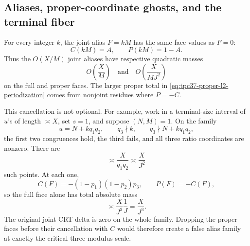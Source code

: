 \subsection{Aliases, proper-coordinate ghosts, and the terminal fiber}

For every integer \(k\), the joint alias \(F=kM\) has the same face values
as \(F=0\):
\begin{equation}
 C(kM)=A,
 \qquad
 P(kM)=1-A.
 \label{eq:tpc37-joint-alias-values}
\end{equation}
Thus the \(O(X/M)\) joint aliases have respective quadratic masses
\begin{equation}
 O\!\left(\frac XM\right)
 \quad\text{and}\quad
 O\!\left(\frac X{MJ^2}\right)
 \label{eq:tpc37-joint-alias-mass-ledger}
\end{equation}
on the full and proper faces.  The larger proper total in
\eqref{eq:tpc37-proper-l2-periodization} comes from nonjoint residues
where \(P=-C\).

This cancellation is not optional.  For example, work in a terminal-size
interval of \(u\)'s of length \(\asymp X\), set \(s=1\), and suppose
\((N,M)=1\).  On the family
\begin{equation}
 u=N+kq_1q_2,
 \qquad
 q_3\nmid k,
 \qquad
 q_3\nmid N+kq_1q_2,
 \label{eq:tpc37-two-hit-ghost-family}
\end{equation}
the first two congruences hold, the third fails, and all three ratio
coordinates are nonzero.  There are
\begin{equation}
 \asymp\frac X{q_1q_2}\asymp\frac X{J^2}
 \label{eq:tpc37-two-hit-count}
\end{equation}
such points.  At each one,
\begin{equation}
 C(F)=-(1-p_1)(1-p_2)p_3,
 \qquad P(F)=-C(F),
 \label{eq:tpc37-two-hit-cancellation}
\end{equation}
so the full face alone has total absolute mass
\begin{equation}
 \asymp\frac X{J^2}\frac1J
 =\frac X{J^3}.
 \label{eq:tpc37-two-hit-critical-mass}
\end{equation}
The original joint CRT delta is zero on the whole family.  Dropping the
proper faces before their cancellation with \(C\) would therefore create
a false alias family at exactly the critical three-modulus scale.

